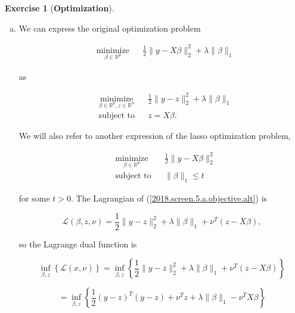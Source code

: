 \documentclass{article}
\theoremstyle{definition}
\newtheorem{exercise}{Exercise}
\theoremstyle{definition}
\theoremstyle{definition}
\theoremstyle{definition}
\begin{document}
\begin{exercise}[\textbf{Optimization}]

\begin{enumerate}[(a)]

\item We can express the original optimization problem

\begin{equation}\label{2018.screen.5.a.objective}
\begin{aligned}
& \underset{\beta \in \mathbb{R}^p}{\text{minimize}}
& & \frac{1}{2} \lVert y - X \beta \rVert_2^2 + \lambda \lVert \beta \rVert_1
\end{aligned}
\end{equation}

as 

\begin{equation}\label{2018.screen.5.a.objective.alt}
\begin{aligned}
& \underset{\beta \in \mathbb{R}^p, z \in \mathbb{R}^n}{\text{minimize}}
& & \frac{1}{2} \lVert y - z \rVert_2^2 + \lambda \lVert \beta \rVert_1 \\
& \text{subject to}
& & z = X \beta.
\end{aligned}
\end{equation}

We will also refer to another expression of the lasso optimization problem,

\begin{equation}\label{2018.screen.5.a.objective.orig}
\begin{aligned}
& \underset{\beta \in \mathbb{R}^p}{\text{minimize}}
& & \frac{1}{2} \lVert y - X \beta \rVert_2^2 \\
& \text{subject to}
& & \lVert\beta \rVert_1 \leq t
\end{aligned}
\end{equation}

for some \(t >0\). The Lagrangian of (\ref{2018.screen.5.a.objective.alt}) is

\[
\mathcal{L}(\beta, z, \nu) = \frac{1}{2} \lVert y - z \rVert_2^2 + \lambda \lVert \beta \rVert_1 + \nu^T(z - X \beta),
\]

so the Lagrange dual function is

\[
\inf_{\beta, z} \left\{ \mathcal{L}(x, \nu)\right\}  = \inf_{\beta, z} \left\{\frac{1}{2} \lVert y - z \rVert_2^2 + \lambda \lVert \beta \rVert_1 + \nu^T(z - X \beta)  \right\}
\]

\[
= \inf_{\beta, z} \left\{\frac{1}{2} (y-z)^T(y-z) + \nu^T z + \lambda \lVert \beta \rVert_1  - \nu^T X \beta  \right\} 
\]


\end{enumerate}
\end{exercise}
\end{document}
